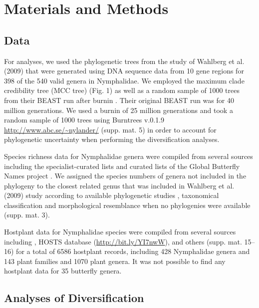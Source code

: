 \documentclass[10pt]{article}
\begin{document}
\section*{Materials and Methods}

\subsection*{Data}

For analyses, we used the phylogenetic trees from the study of Wahlberg
et al. (2009) \cite{wahlberg2009} that were generated using DNA sequence data from
10 gene regions for 398 of the 540 valid genera in Nymphalidae. We
employed the maximum clade credibility tree (MCC tree) (Fig. 1) as well
as a random sample of 1000 trees from their BEAST run after burnin
\cite{wahlberg2009}. Their original BEAST run was for 40 million generations. We
used a burnin of 25 million generations and took a random sample of 1000
trees using Burntrees v.0.1.9 \url{http://www.abc.se/~nylander/} (supp.
mat. 5) in order to account for phylogenetic uncertainty when performing
the diversification analyses.

Species richness data for Nymphalidae genera were compiled from several
sources including the specialist-curated lists 
\cite{tolweb2007, lamas2004} and curated lists of the
Global Butterfly Names project \cite{gbnp}.
We assigned the species numbers of genera not included in the phylogeny
to the closest related genus that was included in Wahlberg et al. (2009)
\cite{wahlberg2009} study according to available phylogenetic studies 
\cite{matos2013, brower2010, kodandaramaiah2010, kodandaramaiah2010a,
ortiz2013, desilva2010, freitas2004, pena2006, penz1999, silva2008,
pena2011, pena2010},
taxonomical classification and morphological resemblance when no
phylogenies were available (supp. mat. 3).

Hostplant data for Nymphalidae species were compiled from several
sources including \cite{ackery1988}, HOSTS database (\url{http://bit.ly/YI7nwW}),
\cite{dyer2002, beccaloni2008, janzen2009} and others (supp. mat. 15--16) for a total of 6586
hostplant records, including 428 Nymphalidae genera and 143 plant
families and 1070 plant genera. It was not possible to find any
hostplant data for 35 butterfly genera.

\subsection*{Analyses of Diversification}
\end{document}
